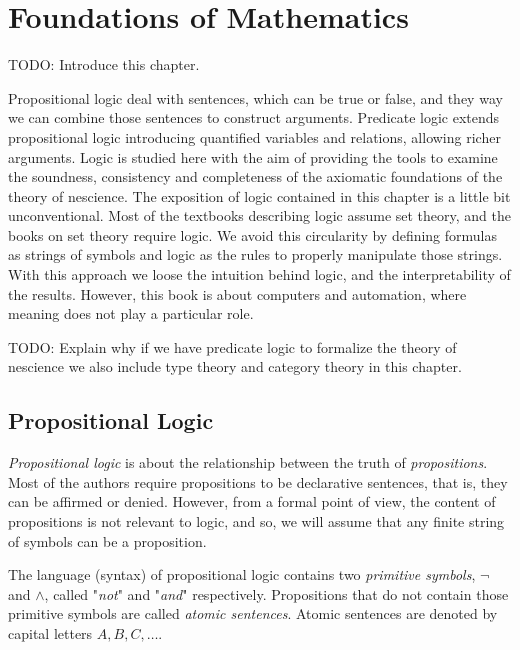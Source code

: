 %
%


\chapter{Foundations of Mathematics}
\label{apx:foundations_mathematics}

{\color{red} TODO: Introduce this chapter.}

Propositional logic deal with sentences, which can be true or false, and they way we can combine those sentences to construct arguments. Predicate logic extends propositional logic introducing quantified variables and relations, allowing richer arguments. Logic is studied here with the aim of providing the tools to examine the soundness, consistency and completeness of the axiomatic foundations of the theory of nescience. The exposition of logic contained in this chapter is a little bit unconventional. Most of the textbooks describing logic assume set theory, and the books on set theory require logic. We avoid this circularity by defining formulas as strings of symbols and logic as the rules to properly manipulate those strings. With this approach we loose the intuition behind logic, and the interpretability of the results. However, this book is about computers and automation, where meaning does not play a particular role.

{\color{red} TODO: Explain why if we have predicate logic to formalize the theory of nescience we also include type theory and category theory in this chapter.}

%
%

\section{Propositional Logic}

\emph{Propositional logic} is about the relationship between the truth of \emph{propositions}. Most of the authors require propositions to be declarative sentences, that is, they can be affirmed or denied. However, from a formal point of view, the content of propositions is not relevant to logic, and so, we will assume that any finite string of symbols can be a proposition. 

The language (syntax) of propositional logic contains two \emph{primitive symbols}, $\lnot$ and $\land$, called "\emph{not}" and "\emph{and}" respectively.  Propositions that do not contain those primitive symbols are called \emph{atomic sentences}. Atomic sentences are denoted by capital letters $A, B, C, \ldots$.

